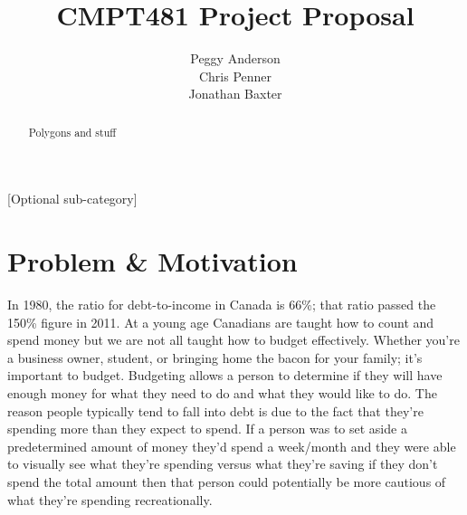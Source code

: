 \documentclass{chi2011}
\begin{document}
\setlength{\paperheight}{11in}
\setlength{\paperwidth}{8.5in}
\setlength{\pdfpageheight}{\paperheight}
\setlength{\pdfpagewidth}{\paperwidth}


\title{CMPT481 Project Proposal}
\author{
\alignauthor Peggy Anderson\\
    \alignauthor Chris Penner\\
    \alignauthor Jonathan Baxter\\
}


\maketitle

\begin{abstract}
    Polygons and stuff
\end{abstract}

[Optional sub-category]


\section{Problem \& Motivation}

In 1980, the ratio for debt-to-income in Canada is 66\%; that ratio passed the 150\% figure in 2011. At a young age 
Canadians are taught how to count and spend money but we are not all taught how to budget effectively. Whether you're 
a business owner, student, or bringing home the bacon for your family; it's important to budget. Budgeting allows a 
person to determine if they will have enough money for what they need to do and what they would like to do. The reason
people typically tend to fall into debt is due to the fact that they're spending more than they expect to spend. If a 
person was to set aside a predetermined amount of money they'd spend a week/month and they were able to visually see what 
they're spending versus what they're saving if they don't spend the total amount then that person could potentially 
be more cautious of what they're spending recreationally.
\end{document}
